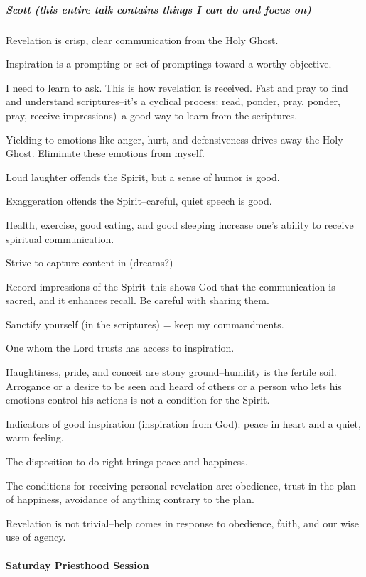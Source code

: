 \subparagraph*{Scott (this entire talk contains things I can do and focus on)} Revelation is crisp, clear communication from the Holy Ghost.

Inspiration is a prompting or set of promptings toward a worthy objective.

I need to learn to ask. This is how revelation is received. Fast and pray to find and understand scriptures--it's a cyclical process: read, ponder, pray, ponder, pray, receive impressions)--a good way to learn from the scriptures.

Yielding to emotions like anger, hurt, and defensiveness drives away the Holy Ghost. Eliminate these emotions from myself.

Loud laughter offends the Spirit, but a sense of humor is good.

Exaggeration offends the Spirit--careful, quiet speech is good.

Health, exercise, good eating, and good sleeping increase one's ability to receive spiritual communication.

Strive to capture content in (dreams?)

Record impressions of the Spirit--this shows God that the communication is sacred, and it enhances recall. Be careful with sharing them.

Sanctify yourself (in the scriptures) = keep my commandments.

One whom the Lord trusts has access to inspiration.

Haughtiness, pride, and conceit are stony ground--humility is the fertile soil. Arrogance or a desire to be seen and heard of others or a person who lets his emotions control his actions is not a condition for the Spirit.

Indicators of good inspiration (inspiration from God): peace in heart and a quiet, warm feeling.

The disposition to do right brings peace and happiness.

The conditions for receiving personal revelation are: obedience, trust in the plan of happiness, avoidance of anything contrary to the plan.

Revelation is not trivial--help comes in response to obedience, faith, and our wise use of agency.

\paragraph*{Saturday Priesthood Session}


